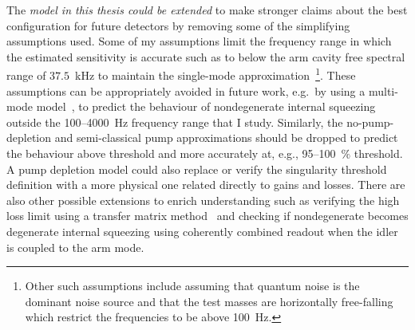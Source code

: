 The \emph{model in this thesis could be extended} to make stronger claims about the best configuration for future detectors by removing some of the simplifying assumptions used.
Some of my assumptions limit the frequency range in which the estimated sensitivity is accurate such as to below the arm cavity free spectral range of $37.5$~kHz to maintain the single-mode approximation~\footnote{Other such assumptions include assuming that quantum noise is the dominant noise source and that the test masses are horizontally free-falling which restrict the frequencies to be above 100~Hz.}. These assumptions can be appropriately avoided in future work, e.g.\ by using a multi-mode model~\cite{liEnhancingInterferometerSensitivity2021}, to predict the behaviour of nondegenerate internal squeezing outside the 100--4000~Hz frequency range that I study.
Similarly, the no-pump-depletion and semi-classical pump approximations should be dropped to predict the behaviour above threshold and more accurately at, e.g., 95--100~$\%$ threshold. A pump depletion model could also replace or verify the singularity threshold definition with a more physical one related directly to gains and losses. 
There are also other possible extensions to enrich understanding such as verifying the high loss limit using a transfer matrix method~\cite{} and checking if nondegenerate becomes degenerate internal squeezing using coherently combined readout when the idler is coupled to the arm mode.

